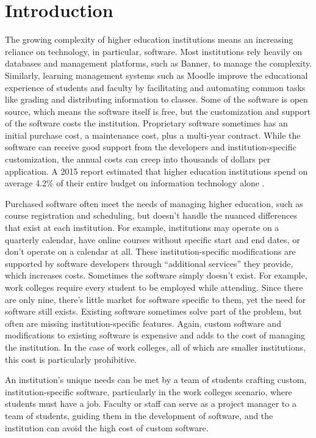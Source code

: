 \section{Introduction}

The growing complexity of higher education institutions means an increasing reliance on technology, in particular, software. Most institutions rely heavily on databases and management platforms, such as Banner, to manage the complexity. Similarly, learning management systems such as Moodle improve the educational experience of students and faculty by facilitating and automating common tasks like grading and distributing information to classes. Some of the software is open source, which means the software itself is free, but the customization and support of the software costs the institution. Proprietary software sometimes has an initial purchase cost, a maintenance cost, plus a multi-year contract. While the software can receive good support from the developers and institution-specific customization, the annual costs can creep into thousands of dollars per application. A 2015 report estimated that higher education institutions spend on average 4.2\% of their entire budget on information technology alone \cite{CDSBenchmarkReport}. 

Purchased software often meet the needs of managing higher education, such as course registration and scheduling, but doesn't handle the nuanced differences that exist at each institution. For example, institutions may operate on a quarterly calendar, have online courses without specific start and end dates, or don't operate on a calendar at all. These institution-specific modifications are supported by software developers through ``additional services'' they provide, which increases costs. Sometimes the software simply doesn't exist. For example, work colleges \cite{WCCMembers} require every student to be employed while attending. Since there are only nine, there's little market for software specific to them, yet the need for software still exists. Existing software sometimes solve part of the problem, but often are missing institution-specific features. Again, custom software and modifications to existing software is expensive and adds to the cost of managing the institution. In the case of work colleges, all of which are smaller institutions, this cost is particularly prohibitive. 

An institution's unique needs can be met by a team of students crafting custom, institution-specific software, particularly in the work colleges scenario, where students must have a job. Faculty or staff can serve as a project manager to a team of students, guiding them in the development of software, and the institution can avoid the high cost of custom software. 

